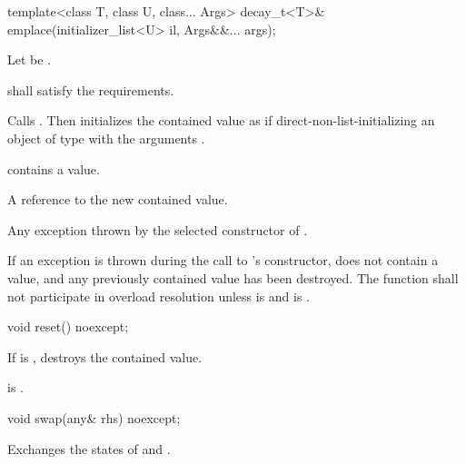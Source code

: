 %
\begin{itemdecl}
template<class T, class U, class... Args>
  decay_t<T>& emplace(initializer_list<U> il, Args&&... args);
\end{itemdecl}

\begin{itemdescr}
\pnum
Let  be .

\pnum
\requires
{} shall satisfy the  requirements.

\pnum
\effects Calls . Then initializes the contained value
as if direct-non-list-initializing an object of type  with the arguments
.

\pnum
\ensures {} contains a value.

\pnum
\returns
A reference to the new contained value.

\pnum
\throws Any exception thrown by the selected constructor of .

\pnum
\remarks If an exception is thrown during the call to 's constructor,
 does not contain a value, and any previously contained value
has been destroyed.
The function shall not participate in overload resolution unless
 is  and
 is .
\end{itemdescr}

%
\begin{itemdecl}
void reset() noexcept;
\end{itemdecl}

\begin{itemdescr}
\pnum
\effects
If  is , destroys the contained value.

\pnum
\ensures
{} is .
\end{itemdescr}

%
\begin{itemdecl}
void swap(any& rhs) noexcept;
\end{itemdecl}

\begin{itemdescr}

\pnum
\effects
Exchanges the states of  and .
\end{itemdescr}

